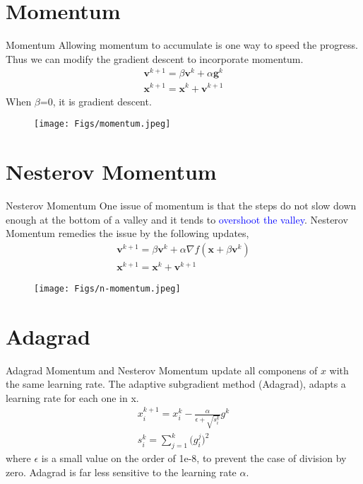 \documentclass{beamer}
\begin{document}
\section{Momentum}
\begin{frame}{Momentum}
Allowing momentum to accumulate is one way to speed the progress. 
Thus we can modify the gradient descent to incorporate momentum.
\begin{gather*}
    \boldsymbol{v}^{k+1} = \beta \boldsymbol{v}^k + \alpha \boldsymbol{g}^k \\
    \boldsymbol{x}^{k+1} = \boldsymbol{x}^k + \boldsymbol{v}^{k+1} 
\end{gather*}
When $\beta$=0, it is gradient descent. 
\begin{figure}
\centering
\texttt{[image: Figs/momentum.jpeg]}
\end{figure}


\end{frame}

\section{Nesterov Momentum}
\begin{frame}{Nesterov Momentum}
One issue of momentum is that the steps do not slow down enough at the bottom of a valley and it tends to \textcolor{blue}{overshoot the valley}. Nesterov Momentum remedies the issue by the following updates,
\begin{gather*}
    \boldsymbol{v}^{k+1} = \beta \boldsymbol{v}^k + \alpha \nabla f(\boldsymbol{x} + \beta \boldsymbol{v}^k) \\
    \boldsymbol{x}^{k+1} = \boldsymbol{x}^k + \boldsymbol{v}^{k+1} 
\end{gather*}

\begin{figure}
\centering
\texttt{[image: Figs/n-momentum.jpeg]}
\end{figure}

\end{frame}

\section{Adagrad}
\begin{frame}{Adagrad}
Momentum and Nesterov Momentum update all componens of $x$ with the same learning rate. The adaptive subgradient method (Adagrad), adapts a learning rate for each one in x.
\begin{gather*}
    x_i^{k+1} = x_i^k - \frac{\alpha}{\epsilon + \sqrt{s_i^k}} g^k \\
    s_i^k = \sum_{j=1}^k \bigg(g_i^j\bigg)^2 
\end{gather*}
where $\epsilon$ is a small value on the order of 1e-8, to prevent the case of division by zero. 
Adagrad is far less sensitive to the learning rate $\alpha$. 
\end{frame}
\end{document}
